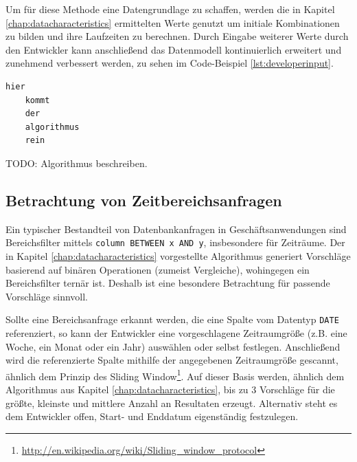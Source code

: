 Um für diese Methode eine Datengrundlage zu schaffen, werden die in Kapitel \ref{chap:datacharacteristics} ermittelten Werte genutzt um initiale Kombinationen zu bilden und ihre Laufzeiten zu berechnen.
Durch Eingabe weiterer Werte durch den Entwickler kann anschließend das Datenmodell kontinuierlich erweitert und zunehmend verbessert werden, zu sehen im Code-Beispiel \ref{lst:developerinput}.

\begin{lstlisting}[caption={Eingaben von Testwert-Konstellationen erweitern gegebenenfalls das Datenmodell}, label={lst:developerinput}, language=Python]
	hier
	kommt
	der
	algorithmus
	rein
\end{lstlisting}

TODO: Algorithmus beschreiben.

\subsection{Betrachtung von Zeitbereichsanfragen}
Ein typischer Bestandteil von Datenbankanfragen in Geschäftsanwendungen sind Bereichsfilter mittels \texttt{column BETWEEN x AND y},  insbesondere für Zeiträume.
Der in Kapitel \ref{chap:datacharacteristics} vorgestellte Algorithmus generiert Vorschläge basierend auf binären Operationen (zumeist Vergleiche), wohingegen ein Bereichsfilter ternär ist.
Deshalb ist eine besondere Betrachtung für passende Vorschläge sinnvoll.

Sollte eine Bereichsanfrage erkannt werden, die eine Spalte vom Datentyp \texttt{DATE} referenziert, so kann der Entwickler eine vorgeschlagene Zeitraumgröße (z.B. eine Woche, ein Monat oder ein Jahr) auswählen oder selbst festlegen.
Anschließend wird die referenzierte Spalte mithilfe der angegebenen Zeitraumgröße gescannt, ähnlich dem Prinzip des Sliding Window\footnote{\url{http://en.wikipedia.org/wiki/Sliding_window_protocol}}.
Auf dieser Basis werden, ähnlich dem Algorithmus aus Kapitel \ref{chap:datacharacteristics}, bis zu 3 Vorschläge für die größte, kleinste und mittlere Anzahl an Resultaten erzeugt.
Alternativ steht es dem Entwickler offen, Start- und Enddatum eigenständig festzulegen.

